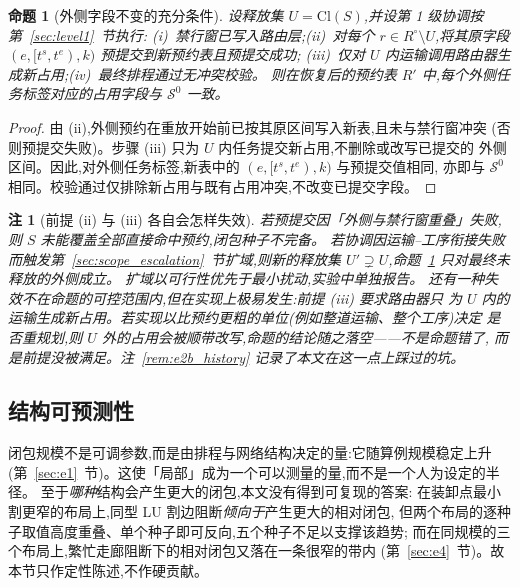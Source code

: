 \documentclass[manuscript,screen,review]{acmart}
\newtheorem{remark}{注}
\newtheorem{prop}{命题}
\begin{document}
\begin{prop}[外侧字段不变的充分条件]
\label{prop:outside}
设释放集 \(U=\mathrm{Cl}(S)\),并设第 1 级协调按第~\ref{sec:level1}~节执行:
(i)~禁行窗已写入路由层;(ii)~对每个 \(r\in R^{\circ}\setminus U\),将其原字段
\((e,[t^s,t^e),k)\) 预提交到新预约表且预提交成功;
(iii)~仅对 \(U\) 内运输调用路由器生成新占用;(iv)~最终排程通过无冲突校验。
则在恢复后的预约表 \(R'\) 中,每个外侧任务标签对应的占用字段与 \(\mathcal{S}^0\) 一致。
\end{prop}

\begin{proof}
由 (ii),外侧预约在重放开始前已按其原区间写入新表,且未与禁行窗冲突
(否则预提交失败)。步骤 (iii) 只为 \(U\) 内任务提交新占用,不删除或改写已提交的
外侧区间。因此,对外侧任务标签,新表中的 \((e,[t^s,t^e),k)\) 与预提交值相同,
亦即与 \(\mathcal{S}^0\) 相同。校验通过仅排除新占用与既有占用冲突,不改变已提交字段。
\end{proof}

\begin{remark}[前提 (ii) 与 (iii) 各自会怎样失效]
\label{rem:precommit}
若预提交因「外侧与禁行窗重叠」失败,则 \(S\) 未能覆盖全部直接命中预约,闭包种子不完备。
若协调因运输--工序衔接失败而触发第~\ref{sec:scope_escalation}~节扩域,则新的释放集
\(U'\supsetneq U\),命题~\ref{prop:outside} 只对最终未释放的外侧成立。
扩域以可行性优先于最小扰动,实验中单独报告。
还有一种失效不在命题的可控范围内,但在实现上极易发生:前提 (iii) 要求路由器\emph{只}
为 \(U\) 内的运输生成新占用。若实现以比预约更粗的单位(例如整道运输、整个工序)决定
是否重规划,则 \(U\) 外的占用会被顺带改写,命题的结论随之落空——不是命题错了,
而是前提没被满足。注~\ref{rem:e2b_history} 记录了本文在这一点上踩过的坑。
\end{remark}

\subsection{结构可预测性}
\label{sec:structure}

闭包规模不是可调参数,而是由排程与网络结构决定的量:它随算例规模稳定上升
(第~\ref{sec:e1}~节)。这使「局部」成为一个可以测量的量,而不是一个人为设定的半径。
至于\emph{哪种}结构会产生更大的闭包,本文没有得到可复现的答案:
在装卸点最小割更窄的布局上,同型 LU 割边阻断\emph{倾向于}产生更大的相对闭包,
但两个布局的逐种子取值高度重叠、单个种子即可反向,五个种子不足以支撑该趋势;
而在同规模的三个布局上,繁忙走廊阻断下的相对闭包又落在一条很窄的带内
(第~\ref{sec:e4}~节)。故本节只作定性陈述,不作硬贡献。

\end{document}
